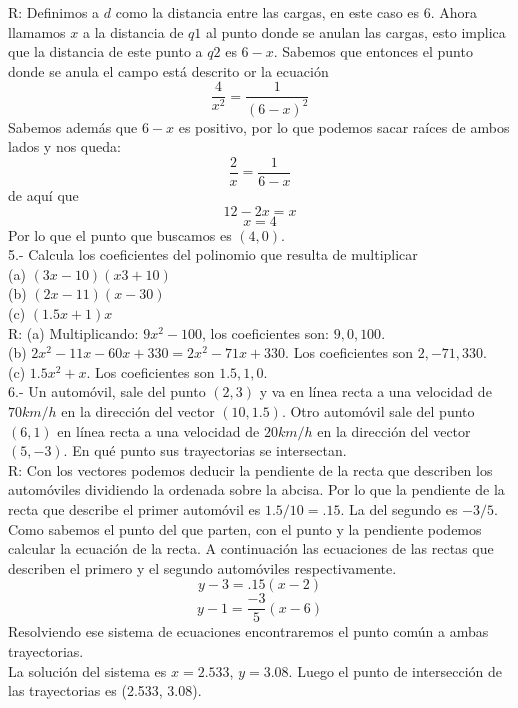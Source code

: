 \documentclass{article}
\begin{document}
R: Definimos a $d$ como la distancia entre las cargas, en este caso es $6$. Ahora llamamos $x$ a la distancia de $q1$ al punto donde se anulan las cargas, esto implica que la distancia de este punto a $q2$ es $6-x$. Sabemos que entonces el punto donde se anula el campo está descrito or la ecuación \[ \frac{4}{x^2} = \frac{1}{(6-x)^2}\] Sabemos además que $6-x$ es positivo, por lo que podemos sacar raíces de ambos lados y nos queda:  \[ \frac{2}{x} = \frac{1}{6-x}\] de aquí que \[ 12 - 2x = x \] \[x = 4\] Por lo que el punto que buscamos es $(4,0)$. \\

5.- Calcula los coeficientes del polinomio que resulta de multiplicar\\
(a) $(3x-10)(x3+10)$\\
(b) $(2x-11)(x-30)$\\
(c) $(1.5x+1)x$\\

R: (a) Multiplicando: $9x^2 - 100$, los coeficientes son: $9, 0, 100$.\\

(b) $2x^2 -11x -60x+ 330 = 2x^2 - 71x + 330$. Los coeficientes son $2, -71, 330$.\\

(c) $1.5x^2 + x$. Los coeficientes son $1.5, 1, 0$.\\ 

6.- Un automóvil, sale del punto $(2,3)$ y va en línea recta a una velocidad de $70 km/h$ en la dirección del vector $(10,1.5)$. Otro automóvil sale del punto $(6,1)$ en línea recta a una velocidad de $20 km/h$ en la dirección del vector $(5,-3)$. En qué punto sus trayectorias se intersectan. \\

R: Con los vectores podemos deducir la pendiente de la recta que describen los automóviles dividiendo la ordenada sobre la abcisa. Por lo que la pendiente de la recta que describe el primer automóvil es $1.5/10 = .15$. La del segundo es $-3/5$. Como sabemos el punto del que parten, con el punto y la pendiente podemos calcular la ecuación de la recta. A continuación las ecuaciones de las rectas que describen el primero y el segundo automóviles respectivamente. \[ y - 3 = .15 (x - 2)\] \[ y - 1 = \frac{-3}{5} (x-6) \] Resolviendo ese sistema de ecuaciones encontraremos el punto común a ambas trayectorias.\\

La solución del sistema es $x = 2.533$, $y = 3.08$. Luego el punto de intersección de las trayectorias es (2.533, 3.08).\\\\
\end{document}
